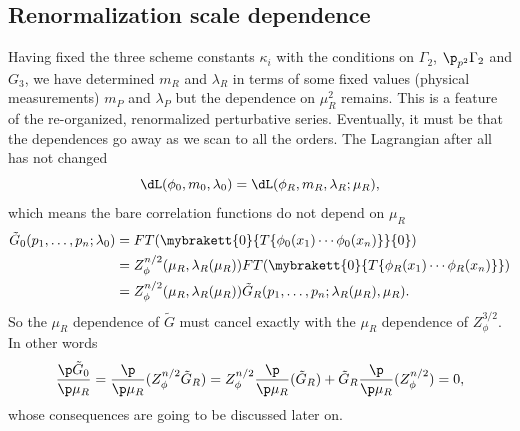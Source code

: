 \subsection{Renormalization scale dependence}
Having fixed the three scheme constants $\kappa_i$ with the conditions on $\Gamma_{2}$, $\p_{p^2}\Gamma_2$ and $G_3$, we have determined $m_R$ and $\lambda_R$ in terms of some fixed values (physical measurements) $m_P$ and $\lambda_P$ but the dependence on $\mu_R^2$ remains. This is a feature of the re-organized, renormalized perturbative series. Eventually, it must be that the dependences go away as we scan to all the orders. The Lagrangian after all has not changed
\begin{equation}
    \dL(\phi_0,m_0,\lambda_0) = \dL(\phi_R,m_R,\lambda_R;\mu_R),
\end{equation}
which means the bare correlation functions do not depend on $\mu_R$
\begin{equation}
    \begin{split}
        \tilde{G}_0(p_1,\dots,p_n;\lambda_0) &= FT(\mybrakett{0}{T\{\phi_0(x_1)\cdots\phi_0(x_n)\}}{0}) \\
        &= Z_\phi^{n/2}(\mu_R,\lambda_R(\mu_R))FT(\mybrakett{0}{T\{\phi_R(x_1)\cdots\phi_R(x_n)\}}) \\
        &= Z_\phi^{n/2}(\mu_R,\lambda_R(\mu_R))\tilde{G}_R(p_1,\dots,p_n;\lambda_R(\mu_R),\mu_R).
    \end{split}
\end{equation}
So the $\mu_R$ dependence of $\tilde{G}$ must cancel exactly with the $\mu_R$ dependence of $Z_\phi^{3/2}$. In other words
\begin{equation}
    \frac{\p\tilde{G}_0}{\p\mu_R} = \frac{\p}{\p\mu_R}(Z_\phi^{n/2}\tilde{G}_R) = Z_\phi^{n/2}\frac{\p}{\p\mu_R}(\tilde{G}_R) + \tilde{G}_R\frac{\p}{\p\mu_R}(Z_\phi^{n/2}) = 0,
\end{equation}
whose consequences are going to be discussed later on.

